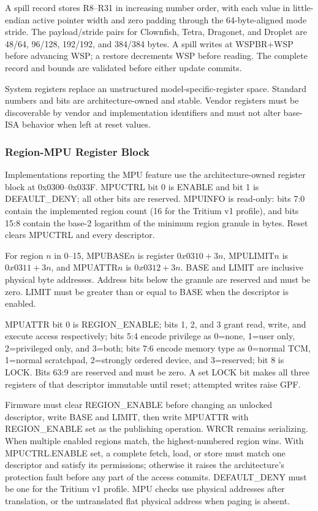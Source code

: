 \documentclass[11pt]{article}
\begin{document}
A spill record stores R8--R31 in increasing number order, with each value in
little-endian active pointer width and zero padding through the 64-byte-aligned
mode stride. The payload/stride pairs for Clownfish, Tetra, Dragonet, and
Droplet are 48/64, 96/128, 192/192, and 384/384 bytes. A spill writes at
WSPBR+WSP before advancing WSP; a restore decrements WSP before reading. The
complete record and bounds are validated before either update commits.

System registers replace an unstructured model-specific-register space. Standard numbers and bits are architecture-owned and stable. Vendor registers must be discoverable by vendor and implementation identifiers and must not alter base-ISA behavior when left at reset values.

\subsubsection{Region-MPU Register Block}

Implementations reporting the MPU feature use the architecture-owned register block at 0x0300--0x033F. MPUCTRL bit 0 is ENABLE and bit 1 is DEFAULT\_DENY; all other bits are reserved. MPUINFO is read-only: bits 7:0 contain the implemented region count (16 for the Tritium v1 profile), and bits 15:8 contain the base-2 logarithm of the minimum region granule in bytes. Reset clears MPUCTRL and every descriptor.

For region $n$ in 0--15, MPUBASE$n$ is register $0x0310+3n$, MPULIMIT$n$ is $0x0311+3n$, and MPUATTR$n$ is $0x0312+3n$. BASE and LIMIT are inclusive physical byte addresses. Address bits below the granule are reserved and must be zero. LIMIT must be greater than or equal to BASE when the descriptor is enabled.

MPUATTR bit 0 is REGION\_ENABLE; bits 1, 2, and 3 grant read, write, and execute access respectively; bits 5:4 encode privilege as 0=none, 1=user only, 2=privileged only, and 3=both; bits 7:6 encode memory type as 0=normal TCM, 1=normal scratchpad, 2=strongly ordered device, and 3=reserved; bit 8 is LOCK. Bits 63:9 are reserved and must be zero. A set LOCK bit makes all three registers of that descriptor immutable until reset; attempted writes raise GPF.

Firmware must clear REGION\_ENABLE before changing an unlocked descriptor, write BASE and LIMIT, then write MPUATTR with REGION\_ENABLE set as the publishing operation. WRCR remains serializing. When multiple enabled regions match, the highest-numbered region wins. With MPUCTRL.ENABLE set, a complete fetch, load, or store must match one descriptor and satisfy its permissions; otherwise it raises the architecture's protection fault before any part of the access commits. DEFAULT\_DENY must be one for the Tritium v1 profile. MPU checks use physical addresses after translation, or the untranslated flat physical address when paging is absent.
\end{document}
